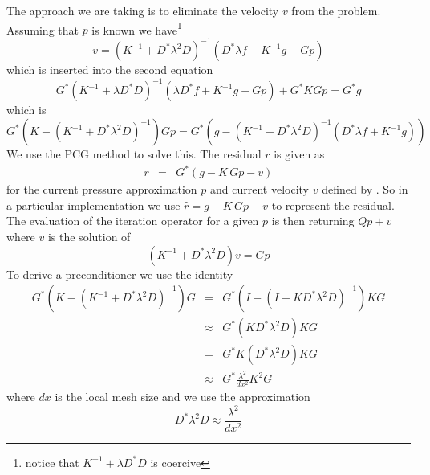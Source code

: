 The approach we are taking is to eliminate the velocity $v$ from the problem.
Assuming that $p$ is known we have\footnote{notice
that $K^{-1}+\lambda D^*D$ is coercive}
\begin{equation}\label{DARCY V FORM}
v= (K^{-1}+ D^*\lambda^2 D)^{-1} ( D^*\lambda f + K^{-1} g - Gp)
\end{equation} 
which is inserted into the second equation
\begin{equation}
G^* (K^{-1}+\lambda D^*D)^{-1} (\lambda D^*f + K^{-1} g - Gp) + G^* KG p = G^*g 
\end{equation} 
which is
\begin{equation}
G^* ( K - (K^{-1}+ D^*\lambda^2 D)^{-1} ) G p = G^* (g-(K^{-1}+D^*\lambda^2 D)^{-1} ( D^*\lambda f + K^{-1} g) ) 
\end{equation} 
We use the PCG method to solve this.
The residual $r$ is given as
\begin{equation}
\begin{array}{rcl}
r & =&  G^* \left( g - K\, G p - v \right)
\end{array}
\end{equation} 
for the current pressure approximation $p$ and current velocity $v$ defined by
.
So in a particular implementation we use $\hat{r}=g-K\, Gp-v$ to represent the residual.
The evaluation of the iteration operator for a given $p$ is then returning
$Qp+v$ where $v$ is the solution of
\begin{equation}\label{UPDATE W}
(K^{-1}+ D^*\lambda^2 D)v = Gp
\end{equation}
To derive a preconditioner we use the identity
\begin{equation}
 \begin{array}{rcl}

G^* ( K - (K^{-1}+ D^*\lambda^2 D)^{-1} ) G  & = & G^* (I - (I + K D^*\lambda^2 D)^{-1}) K G \\
                               & \approx &  G^* (K D^*\lambda^2 D) K G  \\
			       & =  & G^*  K ( D^*  \lambda^2 D) K G \\
			       & \approx  & G^* \frac{\lambda^2}{dx^2} K^2 G
\end{array}
\end{equation} 
where $dx$ is the local mesh size and we use the approximation
\begin{equation}
D^*  \lambda^2 D \approx \frac{\lambda^2}{dx^2}
\end{equation} 
